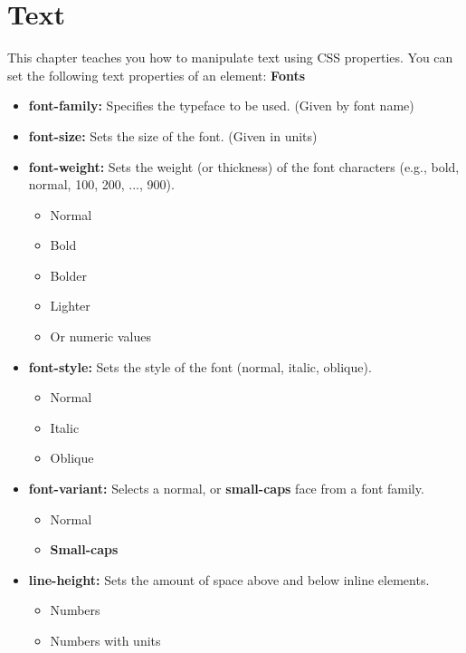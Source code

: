 \documentclass{report}
\begin{document}
    \pagebreak \bigbreak \noindent 
    \section{\LARGE Text}
    \bigbreak \noindent 
    This chapter teaches you how to manipulate text using CSS properties. You can
    set the following text properties of an element:
    \bigbreak \noindent 
    \textbf{Fonts}
    \begin{itemize}
        \item \textbf{font-family:} Specifies the typeface to be used. (Given by font name)
        \item \textbf{font-size:} Sets the size of the font. (Given in units)
        \item \textbf{font-weight:} Sets the weight (or thickness) of the font characters (e.g., bold, normal, 100, 200, ..., 900).
            \begin{itemize}
                \item Normal
                \item Bold 
                \item Bolder
                \item Lighter
                \item Or numeric values
            \end{itemize}
        \item \textbf{font-style:} Sets the style of the font (normal, italic, oblique).
            \begin{itemize}
                \item Normal
                \item Italic 
                \item Oblique
            \end{itemize}
        \item \textbf{font-variant:} Selects a normal, or \textbf{small-caps} face from a font family.
            \begin{itemize}
                \item Normal
                \item \textbf{Small-caps}
            \end{itemize}
        \item \textbf{line-height:} Sets the amount of space above and below inline elements.
            \begin{itemize}
                \item Numbers
                \item Numbers with units
            \end{itemize}
    \end{itemize}
\end{document}
